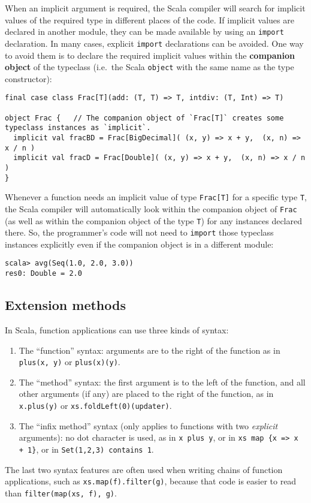 When an implicit argument is required, the Scala compiler will search
for implicit values of the required type in different places of the
code. If implicit values are declared in another module, they can
be made available by using an \lstinline!import! declaration. In
many cases, explicit \lstinline!import! declarations can be avoided.
One way to avoid them is to declare the required implicit values within
the \textbf{companion object} of the typeclass
(i.e.~the Scala \lstinline!object! with the same name as the type
constructor):
\begin{lstlisting}
final case class Frac[T](add: (T, T) => T, intdiv: (T, Int) => T)

object Frac {   // The companion object of `Frac[T]` creates some typeclass instances as `implicit`.
  implicit val fracBD = Frac[BigDecimal]( (x, y) => x + y,  (x, n) => x / n )
  implicit val fracD = Frac[Double]( (x, y) => x + y,  (x, n) => x / n )
}
\end{lstlisting}
Whenever a function needs an implicit value of type \lstinline!Frac[T]!
for a specific type \lstinline!T!, the Scala compiler will automatically
look within the companion object of \lstinline!Frac! (as well as
within the companion object of the type \lstinline!T!) for any instances
declared there. So, the programmer's code will not need to \lstinline!import!
those typeclass instances explicitly even if the companion object
is in a different module:
\begin{lstlisting}
scala> avg(Seq(1.0, 2.0, 3.0))
res0: Double = 2.0
\end{lstlisting}


\subsection{Extension methods}

In Scala, function applications can use three kinds of syntax: 
\begin{enumerate}
\item The ``function'' syntax: arguments are to the right of the function
as in \lstinline!plus(x, y)! or \lstinline!plus(x)(y)!.
\item The ``method'' syntax: the first argument is to the left of the
function, and all other arguments (if any) are placed to the right
of the function, as in \lstinline!x.plus(y)! or \lstinline!xs.foldLeft(0)(updater)!.
\item The ``infix method'' syntax (only applies to functions with two
\emph{explicit} arguments): no dot character is used, as in \lstinline!x plus y!,
or in \lstinline!xs map {x => x + 1}!, or in \lstinline!Set(1,2,3) contains 1!.
\end{enumerate}
The last two syntax features are often used when writing chains of
function applications, such as \lstinline!xs.map(f).filter(g)!, because
that code is easier to read than \lstinline!filter(map(xs, f), g)!. 


